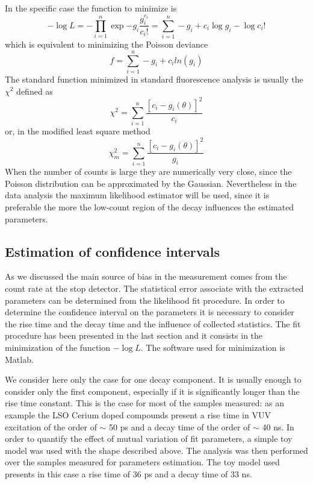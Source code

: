 In the specific case the function to minimize is
\begin{equation}
-\log {L} = - \prod _{i=1}^{n} \exp {-g_{i}} \frac{g_{i}^{c_i}}{c_{i}!} = \sum _{i=1}^{n} -g_{i} + c_{i}\log {g_{i}} - \log {c_{i}!}
\end{equation}
which is equivalent to minimizing the Poisson deviance\cite{Bajzer1991}
\begin{equation}
f = \sum _{i=1}^{n} -g_{i} + c_{i}ln(g_{i})
\end{equation}
The standard function minimized in standard fluorescence analysis is usually the $\chi ^{2}$ defined as
\begin{equation}
\chi ^{2} = \sum _{i=1}^{n} \frac{\left[ c_{i} - g_{i}(\theta) \right] ^{2}}{c_{i}}
\end{equation}
or, in the modified least square method\cite{Bajzer1991}
\begin{equation}
\chi _{m}^{2} = \sum _{i=1}^{n} \frac{\left[ c_{i} - g_{i}(\theta) \right] ^{2}}{g_{i}}
\end{equation}
When the number of counts is large they are numerically very close, since the Poisson distribution can be approximated by the Gaussian. Nevertheless in the data analysis the maximum likelihood estimator will be used, since it is preferable the more the low-count region of the decay influences the estimated parameters\cite{Bajzer1991}. 

\subsection{Estimation of confidence intervals}
As we discussed the main source of bias in the measurement comes from the count rate at the stop detector. The statistical error associate with the extracted parameters can be determined from the likelihood fit procedure.
In order to determine the confidence interval on the parameters it is necessary to consider the rise time and the decay time and the influence of collected statistics.
The fit procedure has been presented in the last section and it consists in the minimization of the function $-\log{L}$.
The software used for minimization is Matlab.

We consider here only the case for one decay component. It is usually enough to consider only the first component, especially if it is significantly longer than the rise time constant. This is the case for most of the samples measured: as an example the LSO Cerium doped compounds present a rise time in VUV excitation of the order of $\sim$ 50 ps and a decay time of the order of $\sim$ 40 ns.
In order to quantify the effect of mutual variation of fit parameters, a simple toy model was used with the shape described above. The analysis was then performed over the samples measured for parameters estimation.
The toy model used presents in this case a rise time of 36 ps and a decay time of 33 ns. 

